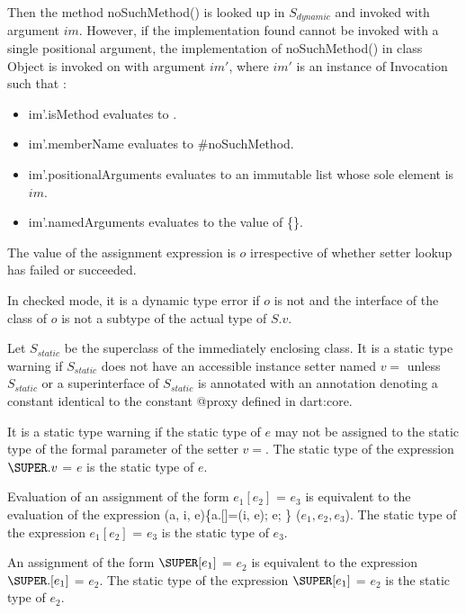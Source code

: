 \documentclass{article}
\newcommand{\code}[1]{{\sf #1}}
\begin{document}
\begin{itemize}
\LMHash{}
Then the method \code{noSuchMethod()} is looked up in $S_{dynamic}$ and invoked  with argument $im$.
However, if the implementation found cannot be invoked with a single positional argument, the implementation  of \code{noSuchMethod()} in class \code{Object} is invoked on \THIS{} with argument $im'$, where $im'$ is an instance of \code{Invocation} such that :
\begin{itemize}
\item  \code{im'.isMethod} evaluates to \code{\TRUE{}}.
\item  \code{im'.memberName} evaluates to \code{\#noSuchMethod}.
\item \code{im'.positionalArguments} evaluates to an immutable list whose sole element is  $im$.
\item \code{im'.namedArguments} evaluates to the value of \code{\CONST{} \{\}}.
\end{itemize}

\LMHash{}
The value of the assignment expression is $o$ irrespective of whether setter lookup has failed or succeeded.

\LMHash{}
In checked mode, it is a dynamic type error if $o$ is not \NULL{} and the interface of the class of $o$ is not a subtype of the actual type of $S.v$.

\LMHash{}
Let $S_{static}$ be the superclass of the immediately enclosing class. It is a static type warning if $S_{static}$ does not have an accessible instance setter named $v=$ unless $S_{static}$ or a superinterface of $S_{static}$ is annotated with an annotation denoting a constant identical to the constant \code{@proxy} defined in \code{dart:core}.

\LMHash{}
It is a static type warning if the static type of $e$ may not be assigned to the static type of the formal parameter of the setter $v=$.   The static type of the expression $\SUPER.v$ \code{=} $e$ is the static type of $e$.






\LMHash{}
Evaluation of an assignment of the form $e_1[e_2]$ \code{=} $e_3$ is equivalent to the evaluation of the expression \code{(a, i, e)\{a.[]=(i, e); \RETURN{} e; \} ($e_1, e_2, e_3$)}.  The static type of the expression $e_1[e_2]$ \code{=} $e_3$ is the static type of $e_3$.

\LMHash{}
An assignment of the form $\SUPER[e_1]$ \code{=} $e_2$ is equivalent to the expression $\SUPER.[e_1]$ \code{=} $e_2$.  The static type of the expression $\SUPER[e_1]$ \code{=} $e_2$ is the static type of $e_2$.



\end{itemize}
\end{document}
